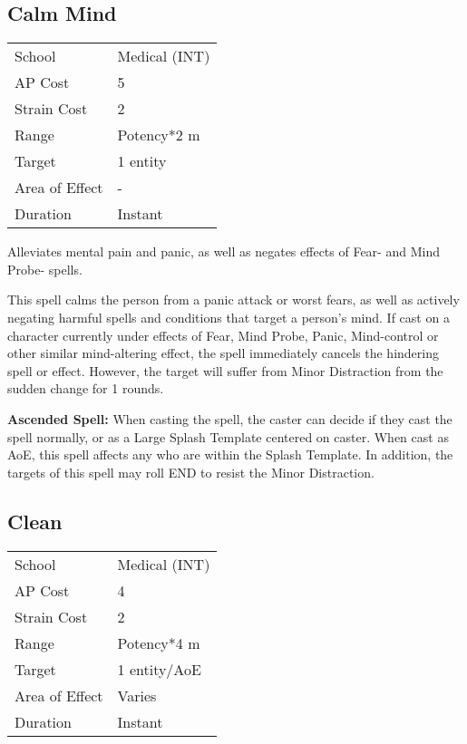 \documentclass[11pt,a4paper,twocolumn]{book}
\begin{document}

\subsection*{Calm Mind}
{
	\begin{tabu} to 75mm{| X[l,4] | X[l,7] |}
		\hline
		School 			& Medical (INT) 		\\
		AP Cost	      	& 5 					\\
		Strain Cost     & 2 					\\
		Range     		& Potency*2 m			\\
		Target      	& 1 entity 				\\
		Area of Effect  & - 	 				\\
		Duration     	& Instant				\\ \hline
	\end{tabu}
	
}

\medskip

Alleviates mental pain and panic, as well as negates effects of Fear- and Mind Probe- spells.

This spell calms the person from a panic attack or worst fears, as well as actively negating harmful spells and conditions that target a person's mind. If cast on a character currently under effects of Fear, Mind Probe, Panic, Mind-control or other similar mind-altering effect, the spell immediately cancels the hindering spell or effect. However, the target will suffer from Minor Distraction from the sudden change for 1 rounds.

\bigskip

\textbf{Ascended Spell:} When casting the spell, the caster can decide if they cast the spell normally, or as a Large Splash Template centered on caster. When cast as AoE, this spell affects any who are within the Splash Template. In addition, the targets of this spell may roll END to resist the Minor Distraction.


\subsection*{Clean}
{
	\begin{tabu} to 75mm{| X[l,4] | X[l,7] |}
		\hline
		School 			& Medical (INT) 		\\
		AP Cost	      	& 4 					\\
		Strain Cost     & 2 					\\
		Range     		& Potency*4 m			\\
		Target      	& 1 entity/AoE 			\\
		Area of Effect  & Varies 	 		\\
		Duration     	& Instant 				\\ \hline
	\end{tabu}
	
}
\end{document}
